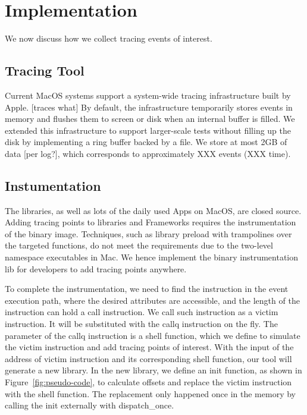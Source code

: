 \section{Implementation}
We now discuss how we collect tracing events of interest.

\subsection{Tracing Tool}
Current MacOS systems support a system-wide tracing infrastructure built by Apple. [traces what]
By default, the infrastructure temporarily stores events in memory and flushes them to screen or disk when an internal buffer is filled.
We extended this infrastructure to support larger-scale tests without filling up the disk by implementing a ring buffer backed by a file.
We store at most 2GB of data [per log?], which corresponds to approximately XXX events (XXX time).


\subsection{Instumentation}
The libraries, as well as lots of the daily used Apps on MacOS, are closed source.
Adding tracing points to libraries and Frameworks requires the instrumentation of the binary image.
Techniques, such as library preload with trampolines over the targeted functions, do not meet the requirements due to the two-level namespace executables in Mac.
We hence implement the binary instrumentation lib for developers to add tracing points anywhere.

To complete the instrumentation, we need to find the instruction in the event execution path, where the desired attributes are accessible, and the length of the instruction can hold a call instruction.
We call such instruction as a victim instruction.
It will be substituted with the callq instruction on the fly.
The parameter of the callq instruction is a shell function, which we define to simulate the victim instruction and add tracing points of interest.
With the input of the address of victim instruction and its corresponding shell function, our tool will generate a new library.
In the new library, we define an init function, as shown in Figure~\ref{fig:pseudo-code}, to calculate offsets and replace the victim instruction with the shell function.
The replacement only happened once in the memory by calling the init externally with dispatch\_once.

